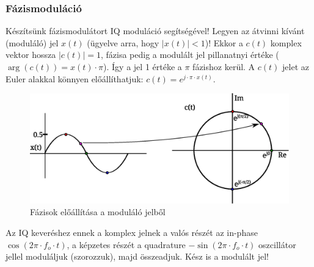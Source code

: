 \documentclass[12pt,a4paper]{article}
\begin{document}
\subsubsection{Fázismoduláció}

Készítsünk fázismodulátort IQ moduláció segítségével! Legyen az átvinni kívánt (moduláló) jel $x(t)$ (ügyelve arra, hogy $\vert x(t) \vert<1$)! Ekkor a $c(t)$ komplex vektor hossza $\vert c(t) \vert = 1$, fázisa pedig a modulált jel pillanatnyi értéke ($\arg\left(c(t)\right)=x(t) \cdot \pi$). Így a jel 1 értéke a $\pi$ fázishoz kerül. A $c(t)$ jelet az Euler alakkal könnyen előállíthatjuk: $c(t)=e^{j \cdot \pi \cdot x(t)}$.

\begin{figure}[H]
\begin{center}
\includegraphics[width=13cm]{figures/modulaciok_workshop_pm.eps}
\caption{Fázisok előállítása a moduláló jelből}
\label{fig:pm}
\end{center}
\end{figure}

Az IQ keveréshez ennek a komplex jelnek a valós részét az in-phase $\cos(2\pi \cdot f_o \cdot t)$, a képzetes részét a quadrature $-\sin(2\pi \cdot f_o \cdot t)$ oszcillátor jellel moduláljuk (szorozzuk), majd összeadjuk. Kész is a modulált jel!
\end{document}
